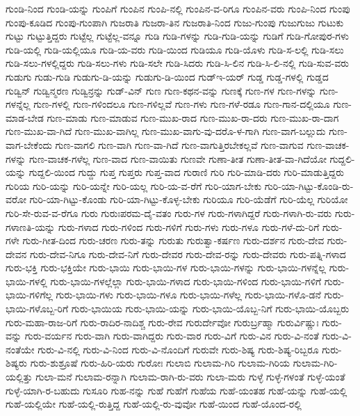 {ಗುಂಡಿ-ನಿಂದ
ಗುಂಡಿ-ಯನ್ನು
ಗುಂಪಿಗೆ
ಗುಂಪಿನ
ಗುಂಪಿ-ನಲ್ಲಿ
ಗುಂಪಿನ-ವ-ರಿಗೂ
ಗುಂಪಿನ-ವರು
ಗುಂಪಿ-ನಿಂದ
ಗುಂಪು
ಗುಂಪು-ಕೂಡಿದ
ಗುಂಪು-ಗುಂಪಾಗಿ
ಗುಜರಾತಿ
ಗುಜರಾ-ತಿನ
ಗುಜರಾತಿ-ನಿಂದ
ಗುಜು-ಗುಂಪು
ಗುಜುಗುಜು
ಗುಟುಕು
ಗುಟ್ಟು
ಗುಟ್ಟುತ್ತಿದ್ದರು
ಗುಟ್ಟೆಲ್ಲ
ಗುಟ್ಟೆಲ್ಲ-ವನ್ನೂ
ಗುಡಿ
ಗುಡಿ-ಗಳನ್ನು
ಗುಡಿ-ಗುಡಿ-ಯನ್ನು
ಗುಡಿಗೆ
ಗುಡಿ-ಗೋಪುರ-ಗಳು
ಗುಡಿ-ಯಲ್ಲಿ
ಗುಡಿ-ಯಲ್ಲಿಯೂ
ಗುಡಿ-ಯ-ವರು
ಗುಡಿ-ಯಿಂದ
ಗುಡಿಯೂ
ಗುಡಿ-ಯೊಳು
ಗುಡಿ-ಸ-ಲಲ್ಲಿ
ಗುಡಿ-ಸಲು
ಗುಡಿ-ಸಲು-ಗಳಲ್ಲಿದ್ದರು
ಗುಡಿ-ಸಲು-ಗಳು
ಗುಡಿ-ಸಲೇ
ಗುಡಿ-ಸಿದರು
ಗುಡಿ-ಸಿ-ಲಿನ
ಗುಡಿ-ಸಿ-ಲಿ-ನಲ್ಲಿ
ಗುಡಿ-ಸುವ-ವರು
ಗುಡುಗು
ಗುಡು-ಗುಡಿ
ಗುಡುಗು-ಡಿ-ಯನ್ನು
ಗುಡುಗು-ಡಿ-ಯಿಂದ
ಗುಡ್ಇ-ಯರ್
ಗುಡ್ಡ
ಗುಡ್ಡ-ಗಳಲ್ಲಿ
ಗುಡ್ಡದ
ಗುಡ್ವಿನ್
ಗುಡ್ವಿನ್ಮರಣ
ಗುಡ್ವಿನ್ರನ್ನು
ಗುಡ್-ವಿನ್
ಗುಣ
ಗುಣ-ಕಥನ-ವನ್ನು
ಗುಣಕ್ಕೆ
ಗುಣ-ಗಳ
ಗುಣ-ಗಳನ್ನು
ಗುಣ-ಗಳನ್ನೆಲ್ಲ
ಗುಣ-ಗಳಲ್ಲಿ
ಗುಣ-ಗಳಿಂದಲೂ
ಗುಣ-ಗಳಿಲ್ಲವೆ
ಗುಣ-ಗಳು
ಗುಣ-ಗಳೆ-ರಡೂ
ಗುಣ-ಗಾನ-ದಲ್ಲಿಯೂ
ಗುಣ-ಮಾಡ-ಬೇಡ
ಗುಣ-ಮಾಡು
ಗುಣ-ಮಾಡುವ
ಗುಣ-ಮುಖ-ರಾದ
ಗುಣ-ಮುಖ-ರಾ-ದರು
ಗುಣ-ಮುಖ-ರಾ-ದಾಗ
ಗುಣ-ಮುಖ-ವಾ-ಗಿದೆ
ಗುಣ-ಮುಖ-ವಾಗಿಲ್ಲ
ಗುಣ-ಮುಖ-ವಾಗು-ವು-ದರೊ-ಳ-ಗಾಗಿ
ಗುಣ-ವಾಗ-ಬಲ್ಲುದು
ಗುಣ-ವಾಗ-ಬೇಕೆಂದು
ಗುಣ-ವಾಗಲಿ
ಗುಣ-ವಾಗಿ
ಗುಣ-ವಾ-ಗಿದೆ
ಗುಣ-ವಾಗುತ್ತಿರಬೇಕಲ್ಲವೆ
ಗುಣ-ವಾಗುವ
ಗುಣ-ವಾಚಕ-ಗಳನ್ನು
ಗುಣ-ವಾಚಕ-ಗಳೆಲ್ಲ
ಗುಣ-ವಾದ
ಗುಣ-ವಾಯಿತು
ಗುಣವೇ
ಗುಣಾ-ತೀತ
ಗುಣಾ-ತೀತ-ವಾ-ಗಿದೆಯೋ
ಗುದ್ದಲಿ-ಯನ್ನು
ಗುದ್ದಲಿ-ಯಿಂದ
ಗುದ್ದು
ಗುಪ್ತ
ಗುಪ್ತರು
ಗುಪ್ತ-ವಾದ
ಗುರಾಣಿ
ಗುರಿ
ಗುರಿ-ಮಾಡಿ-ದರು
ಗುರಿ-ಮಾಡುತ್ತಿದ್ದರು
ಗುರಿಯ
ಗುರಿ-ಯನ್ನು
ಗುರಿ-ಯನ್ನೇ
ಗುರಿ-ಯಲ್ಲ
ಗುರಿ-ಯ-ವ-ರೆಗೆ
ಗುರಿ-ಯಾಗ-ಬೇಕು
ಗುರಿ-ಯಾ-ಗಿಟ್ಟು-ಕೊಂಡಿ-ರು-ವರೋ
ಗುರಿ-ಯಾ-ಗಿಟ್ಟು-ಕೊಂಡು
ಗುರಿ-ಯಾ-ಗಿಟ್ಟು-ಕೊಳ್ಳ-ಬೇಕು
ಗುರಿಯೂ
ಗುರಿ-ಯೆಡೆಗೆ
ಗುರಿ-ಯೆಲ್ಲ
ಗುರಿಯೋ
ಗುರಿ-ಸೇ-ರುವ-ವ-ರೆಗೂ
ಗುರು
ಗುರುಃಪರಮ-ದೈ-ವತಂ
ಗುರು-ಗಳ
ಗುರು-ಗಳಾಗಿದ್ದರೆ
ಗುರು-ಗಳಾಗಿ-ರು-ವರು
ಗುರು-ಗಳಾಣತಿ-ಯನ್ನು
ಗುರು-ಗಳಾದ
ಗುರು-ಗಳಿಂದ
ಗುರು-ಗಳಿಗೆ
ಗುರು-ಗಳು
ಗುರು-ಗಳೂ
ಗುರು-ಗಳೆ-ದು-ರಿಗೆ
ಗುರು-ಗಳೇ
ಗುರು-ಗೀತ-ದಿಂದ
ಗುರು-ಚರಣ
ಗುರು-ತನ್ನು
ಗುರುತು
ಗುರುತ್ವಾ-ಕರ್ಷಣ
ಗುರು-ದರ್ಶನ
ಗುರು-ದೇವ
ಗುರು-ದೇವನ
ಗುರು-ದೇವ-ನಿಗೂ
ಗುರು-ದೇವ-ನಿಗೆ
ಗುರು-ದೇವರ
ಗುರು-ದೇವ-ರನ್ನು
ಗುರು-ದೇವರು
ಗುರು-ಪತ್ನಿ-ಗಳಾದ
ಗುರು-ಭಕ್ತಿ
ಗುರು-ಭಕ್ತಿಯೇ
ಗುರು-ಭಾಯಿ
ಗುರು-ಭಾಯಿ-ಗಳ
ಗುರು-ಭಾಯಿ-ಗಳನ್ನು
ಗುರು-ಭಾಯಿ-ಗಳನ್ನೆಲ್ಲ
ಗುರು-ಭಾಯಿ-ಗಳಲ್ಲಿ
ಗುರು-ಭಾಯಿ-ಗಳಲ್ಲೆಲ್ಲಾ
ಗುರು-ಭಾಯಿ-ಗಳಾದ
ಗುರು-ಭಾಯಿ-ಗಳಿಂದ
ಗುರು-ಭಾಯಿ-ಗಳಿಗೆ
ಗುರು-ಭಾಯಿ-ಗಳಿಗೆಲ್ಲ
ಗುರು-ಭಾಯಿ-ಗಳು
ಗುರು-ಭಾಯಿ-ಗಳೂ
ಗುರು-ಭಾಯಿ-ಗಳೆಲ್ಲ
ಗುರು-ಭಾಯಿ-ಗಳೊ-ಡನೆ
ಗುರು-ಭಾಯಿ-ಗಳೊಬ್ಬ-ರಿಗೆ
ಗುರು-ಭಾಯಿಯ
ಗುರು-ಭಾಯಿ-ಯನ್ನು
ಗುರು-ಭಾಯಿ-ಯೊಬ್ಬ-ನಿಗೆ
ಗುರು-ಭಾಯಿ-ಯೊಬ್ಬರು
ಗುರು-ಮಹಾ-ರಾಜ-ರಿಗೆ
ಗುರು-ರಾದಿರ-ನಾದಿಶ್ಚ
ಗುರು-ರೇವ
ಗುರುರ್ದೇವೋ
ಗುರುರ್ಬ್ರಹ್ಮಾ
ಗುರುರ್ವಿಷ್ಣುಃ
ಗುರು-ವನ್ನು
ಗುರು-ವರ್ಯನ
ಗುರು-ವಾಗಿ
ಗುರು-ವಾಗಿದ್ದರು
ಗುರು-ವಾರ
ಗುರು-ವಿಗೆ
ಗುರು-ವಿನ
ಗುರು-ವಿ-ನಂತೆ
ಗುರು-ವಿ-ನಂತೆಯೇ
ಗುರು-ವಿ-ನಲ್ಲಿ
ಗುರು-ವಿ-ನಿಂದ
ಗುರು-ವಿ-ನೊಂದಿಗೆ
ಗುರುವೇ
ಗುರು-ಶಿಷ್ಯ
ಗುರು-ಶಿಷ್ಯ-ರಿಬ್ಬರೂ
ಗುರು-ಶಿಷ್ಯರು
ಗುರು-ಶುಶ್ರೂಷೆ
ಗುರು-ಹಿರಿ-ಯರು
ಗುರೋಃ
ಗುಲಾಬಿ
ಗುಲಾಮ-ಗಿರಿ
ಗುಲಾಮ-ಗಿರಿಯ
ಗುಲಾಮ-ಗಿರಿ-ಯಲ್ಲಿತ್ತು
ಗುಲಾ-ಮನೆ
ಗುಲಾಮ-ರನ್ನಾಗಿ
ಗುಲಾಮ-ರಾಗಿ-ರು-ವರು
ಗುಲಾ-ಮರು
ಗುಳ್ಳೆ
ಗುಳ್ಳೆ-ಗಳಂತೆ
ಗುಳ್ಳೆ-ಯಂತೆ
ಗುಳ್ಳೆ-ಯಾಗಿ-ರ-ಬಹುದು
ಗುಸೂರಿ
ಗುಹ-ನನ್ನು
ಗುಹೆ
ಗುಹೆಗೆ
ಗುಹೆಯ
ಗುಹೆ-ಯಂತಹ
ಗುಹೆ-ಯನ್ನು
ಗುಹೆ-ಯಲ್ಲಿ
ಗುಹೆ-ಯಲ್ಲಿಯೇ
ಗುಹೆ-ಯಲ್ಲಿ-ರುತ್ತಿದ್ದ
ಗುಹೆ-ಯಲ್ಲಿ-ರು-ವುವೋ
ಗುಹೆ-ಯಿಂದ
ಗುಹೆ-ಯೊಂದ-ರಲ್ಲಿ
}
